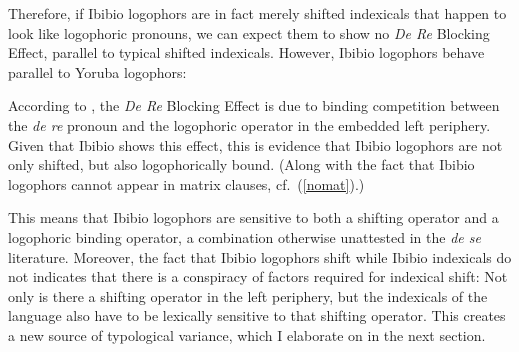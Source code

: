 \documentclass[output=paper]{langscibook}
\begin{document}
Therefore, if Ibibio logophors are in fact merely shifted indexicals that happen to look like logophoric pronouns, we can expect them to show no \textit{De Re} Blocking Effect, parallel to typical shifted indexicals. However, Ibibio logophors behave parallel to Yoruba logophors:\largerpage[2]
\begin{exe}
\end{exe}

According to \citet{Anand2006}, the \textit{De Re} Blocking Effect is due to binding competition between the \textit{de re} pronoun and the logophoric operator in the embedded left periphery. Given that Ibibio shows this effect, this is evidence that Ibibio logophors are not only shifted, but also logophorically bound. (Along with the fact that Ibibio logophors cannot appear in matrix clauses, cf.\ (\ref{nomat}).)

This means that Ibibio logophors are sensitive to both a shifting operator and a logophoric binding operator, a combination otherwise unattested in the \textit{de se} literature. Moreover, the fact that Ibibio logophors shift while Ibibio indexicals do not indicates that there is a conspiracy of factors required for indexical shift: Not only is there a shifting operator in the left periphery, but the indexicals of the language also have to be lexically sensitive to that shifting operator. This creates a new source of typological variance, which I elaborate on in the next section.
\end{document}
